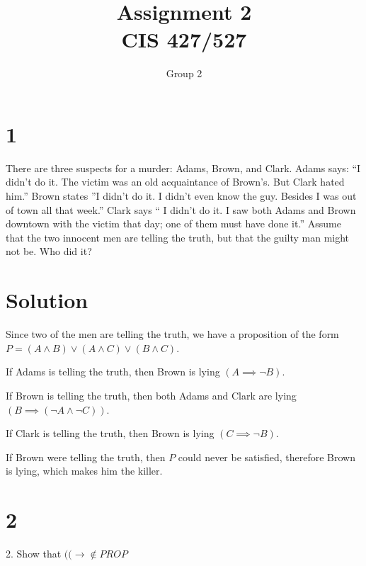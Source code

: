 \documentclass{article}
\begin{document}
\title{Assignment \raisebox{.22ex}{\large\#}2 \\
	CIS 427/527}
\author{Group 2}

\maketitle


\section*{1}
There are three suspects for a murder: Adams, Brown, and Clark. Adams says: “I didn’t do it. The victim was an old acquaintance of Brown’s. But Clark hated him.” Brown states ”I didn’t do it. I didn’t even know the guy. Besides I was out of town all that week.” Clark says “ I didn’t do it. I saw both Adams and Brown downtown with the victim that day; one of them must have done it.” Assume that the two innocent men are telling the truth, but that the guilty man might not be. Who did it?

\section*{Solution}
Since two of the men are telling the truth, we have a proposition of the form $P = (A \land B) \lor (A \land C) \lor (B \land C)$. 
\begin{itemize*}
\item If Adams is telling the truth, then Brown is lying $(A\implies \lnot B)$.
\item If Brown is telling the truth, then both Adams and Clark are lying $(B\implies (\lnot A \land \lnot C))$.
\item If Clark is telling the truth, then Brown is lying $(C\implies \lnot B)$.
\end{itemize*}

\noindent If Brown were telling the truth, then $P$ could never be satisfied, therefore Brown is lying, which makes him the killer.


\section*{2}
\begin{description*}
	\item[2.] Show that $(( \to \notin PROP$
\end{description*}
\end{document}
